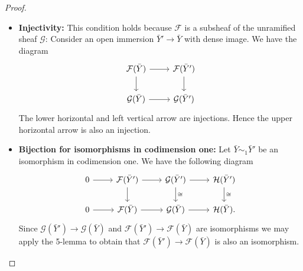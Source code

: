 \documentclass{amsart}
\theoremstyle{definition}
\newcommand\llog{\mathrm{log}}
\numberwithin{equation}{section}
\begin{document}
\begin{proof}
	\begin{itemize}
			\item \textbf{Injectivity: } This condition holds because $\mathcal{F}$ is a subsheaf of the unramified sheaf $\mathcal{G}$: Consider an open immersion $\bar{Y}'\to \bar{Y}$ with dense image. We have the diagram 
			\[
			\begin{tikzcd}
	 			\mathcal{F}(\bar{Y})\arrow[r]\arrow[d]&\mathcal{F}(\bar{Y}')\arrow[d]\\
				\mathcal{G}(\bar{Y})\arrow[r]&\mathcal{G}(\bar{Y}')
			\end{tikzcd}
			\]
			The lower horizontal and left vertical arrow are injections. Hence the upper horizontal arrow is also an injection.
			\item \textbf{Bijection for isomorphisms  in codimension one:} Let $\bar{Y}\sim_1 \bar{Y}'$ be an isomorphism in codimension one. We have the following diagram
			\[
			\begin{tikzcd}
				0\ar[r]&\mathcal{F}(\bar{Y}')\ar[r]\ar[d]&\mathcal{G}(\bar{Y}')\ar[r]\ar[d,"\cong"]&\mathcal{H}(\bar{Y}')\ar[d,"\cong"]\\
				0\ar[r]&\mathcal{F}(\bar{Y})\ar[r]&\mathcal{G}(\bar{Y})\ar[r]&\mathcal{H}(\bar{Y}).
			\end{tikzcd}
			\]
			Since $\mathcal{G}(\bar{Y}')\to \mathcal{G}(\bar{Y})$ and $\mathcal{F}(\bar{Y}')\to \mathcal{F}(\bar{Y})$ are isomorphisms we may apply the 5-lemma to obtain that $\mathcal{F}(\bar{Y}')\to \mathcal{F}(\bar{Y})$ is also an isomorphism. \qedhere
%			
	\end{itemize}
\end{proof}
\end{document}
